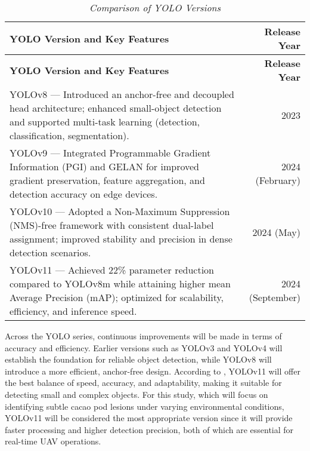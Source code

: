 \begin{longtable}{p{8cm} r}
	\caption{\textit{Comparison of YOLO Versions}} \label{tab:yolo_comparison} \\
	
	\toprule
	\textbf{YOLO Version and Key Features} & \textbf{Release Year} \\
	\midrule
	\endfirsthead
	
	\toprule
	\textbf{YOLO Version and Key Features} & \textbf{Release Year} \\
	\midrule
	\endhead
	
	\bottomrule
	\endfoot
	
	YOLOv8 — Introduced an anchor-free and decoupled head architecture; enhanced small-object detection and supported multi-task learning (detection, classification, segmentation). & 2023 \\
	\midrule
	YOLOv9 — Integrated Programmable Gradient Information (PGI) and GELAN for improved gradient preservation, feature aggregation, and detection accuracy on edge devices. & 2024 (February) \\
	\midrule
	YOLOv10 — Adopted a Non-Maximum Suppression (NMS)-free framework with consistent dual-label assignment; improved stability and precision in dense detection scenarios. & 2024 (May) \\
	\midrule
	YOLOv11 — Achieved 22\% parameter reduction compared to YOLOv8m while attaining higher mean Average Precision (mAP); optimized for scalability, efficiency, and inference speed. & 2024 (September) \\
\end{longtable}

Across the YOLO series, continuous improvements will be made in terms of accuracy and efficiency. Earlier versions such as YOLOv3 and YOLOv4 will establish the foundation for reliable object detection, while YOLOv8 will introduce a more efficient, anchor-free design. According to \cite{UltralyticsBlog2025}, YOLOv11 will offer the best balance of speed, accuracy, and adaptability, making it suitable for detecting small and complex objects. For this study, which will focus on identifying subtle cacao pod lesions under varying environmental conditions, YOLOv11 will be considered the most appropriate version since it will provide faster processing and higher detection precision, both of which are essential for real-time UAV operations.

